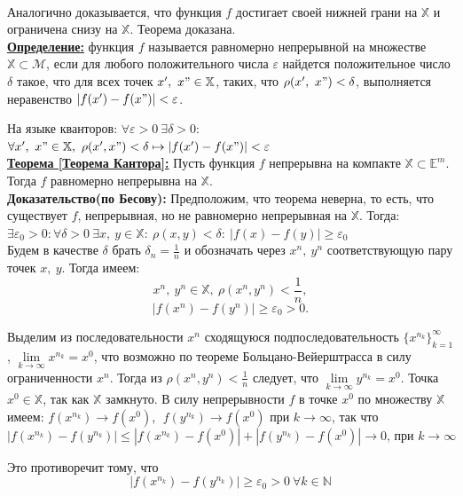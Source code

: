 \documentclass[a4paper,12pt]{article} %
\renewcommand {\geq}{\geqslant}
\renewcommand {\leq}{\leqslant}
\begin{document}
	\
	
	Аналогично доказывается, что функция $f$ достигает своей нижней грани на $\mathbb{X}$ и ограничена снизу на $\mathbb{X}$. Теорема доказана.\\ 
	
	\underline{\textbf{Определение:}} функция $f$ называется равномерно непрерывной на множестве $\mathbb{X} \subset \mathscr{M}$, 
	если для любого положительного числа $\varepsilon$ найдется положительное число $\delta$ такое, что
	для всех точек $x', ~ x" \in \mathbb{X}$, таких, что $\rho(x', ~x") < \delta$, выполняется неравенство
	$|f(x') - f(x")| < \varepsilon$.
	
	На языке кванторов:
	$\forall \varepsilon > 0 ~\exists\delta > 0:$ $\forall x', ~x" \in \mathbb{X}, ~\rho(x', x") < \delta \mapsto |f(x') - f(x")| < \varepsilon$\\
	
	\underline{\textbf{Теорема [Теорема Кантора]:}} Пусть функция $f$ непрерывна на компакте $\mathbb{X} \subset \mathbb{E}^m$. Тогда $f$
	равномерно непрерывна на $\mathbb{X}$.\\
	
	\textbf{Доказательство(по Бесову):} Предположим, что теорема неверна, то есть, что существует $f$, непрерывная, но не равномерно
	непрерывная на $\mathbb{X}$. Тогда:
	\\$ \exists \varepsilon_0 > 0 : \forall \delta > 0 ~\exists x, ~y \in \mathbb{X}: ~\rho(x, y) < \delta: ~ |f(x) - f(y)| \geq \varepsilon_0$
	\\Будем в качестве $\delta$ брать $\delta_n = \frac{1}{n}$ и обозначать через $x^{n}, ~y^{n}$ соответствующую пару точек $x, ~y$. Тогда имеем:
	$$x^{n}, ~y^{n} \in \mathbb{X}, ~\rho(x^{n}, y^{n}) < \frac{1}{n},$$
	$$|f(x^{n}) - f(y^{n})| \geq \varepsilon_0 > 0.$$
	
	Выделим из последовательности ${x^{n}}$ сходящуюся подпоследовательность $\{x^{n_k}\}_{k = 1}^\infty$,
	$\lim\limits_{k \to \infty}x^{n_k} = x^{0}$, что возможно по теореме Больцано-Вейерштрасса в силу ограниченности
	$x^{n}$. Тогда из $\rho(x^{n}, y^{n}) < \frac{1}{n}$ следует, что $\lim\limits_{k \to \infty}y^{n_k} = x^{0}$.
	Точка $x^{0} \in \mathbb{X}$, так как $\mathbb{X}$ замкнуто. В силу непрерывности $f$ в точке
	$x^{0}$ по множеству $\mathbb{X}$ имеем:
	$f(x^{n_k}) \to f(x^{0})$, $\; f(y^{n_k}) \to f(x^{0})$ при $k \to \infty$, так что
	$$|f(x^{n_k}) - f(y^{n_k})| \leq  |f(x^{n_k}) - f(x^{0})| + |f(y^{n_k}) - f(x^{0})| \to 0 \text{, при } k \to \infty$$
	
	Это противоречит тому, что 
	$$|f(x^{n_k}) - f(y^{n_k})| \geq \varepsilon_0 > 0 ~\forall k \in \mathbb{N}$$
	
\end{document}
